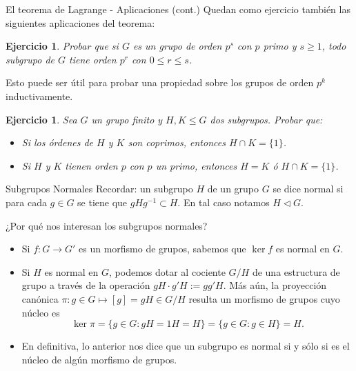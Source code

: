 \documentclass{beamer}
\newtheorem{ejercicio}[teorema]{Ejercicio}
\begin{document}
\begin{frame}{El teorema de Lagrange - Aplicaciones (cont.)}
 Quedan como ejercicio también las siguientes aplicaciones del teorema:
 \begin{ejercicio} Probar que si $G$ es un grupo de orden $p^s$ con $p$ primo y $s \geq 1$, todo subgrupo de $G$ tiene orden $p^r$ con $0 \leq r \leq s$.
\end{ejercicio} Esto puede ser útil para probar una propiedad sobre los grupos de orden $p^k$ inductivamente.
 \begin{ejercicio} Sea $G$ un grupo finito y $H,K \leq G$ dos subgrupos. Probar que:
\begin{itemize}
\item[(i)] Si los órdenes de $H$ y $K$ son coprimos, entonces $H \cap K = \{1\}$.
\item[(ii)] Si $H$ y $K$ tienen orden $p$ con $p$ un primo, entonces $H = K$ ó $H \cap K = \{1\}$.
\end{itemize}
\end{ejercicio}
\end{frame}

\begin{frame}{Subgrupos Normales}
Recordar: un subgrupo $H$ de un grupo $G$ se dice \alert{normal} si para cada $g \in G$ se tiene que $gHg^{-1} \subset H$. En tal caso notamos $H \triangleleft G$. \medskip

 ¿Por qué nos interesan los subgrupos normales?
\begin{itemize}
 \item Si $f : G \to G'$ es un morfismo de grupos, sabemos que $\ker f$ es normal en $G$.
 \item Si $H$ es normal en $G$, podemos \alert{dotar al cociente $G/H$ de una estructura de grupo } a través de la operación $gH \cdot g'H := gg'H$.  Más aún, la \alert{proyección canónica} $\pi : g \in G \mapsto [g] = gH \in G/H$ \alert{resulta un morfismo} de grupos cuyo núcleo es
\[
\ker \pi = \{g \in G : gH = 1H = H\} = \{g \in G : g \in H\} = H.
\]
 \item En definitiva, lo anterior nos dice que un subgrupo es normal si y sólo si es el núcleo de algún morfismo de grupos.
\end{itemize}
\end{frame}
\end{document}
